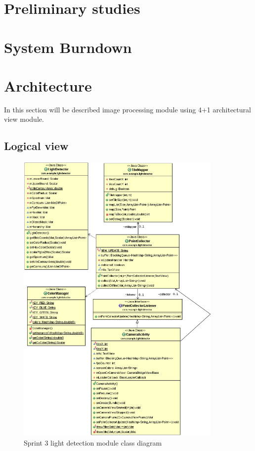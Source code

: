 \section{Preliminary studies}

\section{System Burndown}
\section{Architecture}
In this section will be described image processing module using 4+1 architectural view module.

\subsection{Logical view}

\begin{figure}[H]
	\centering
		\includegraphics[width=10cm]{sprint3/sprint3.png}
	\caption{Sprint 3 light detection module class diagram}
	\label{fig:class_diagram_sprint3}
\end{figure}

